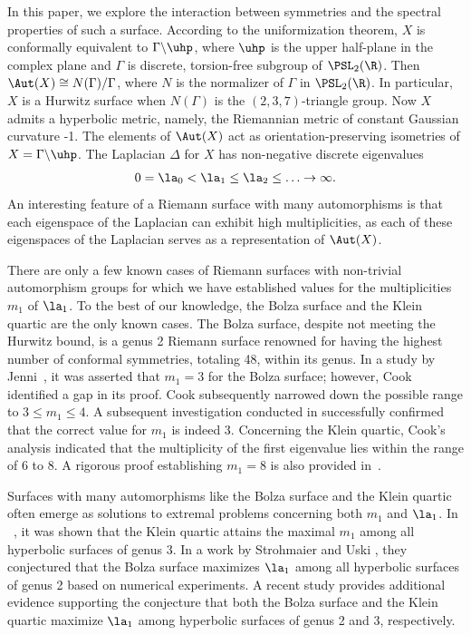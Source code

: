In this paper, we explore the interaction between symmetries and the spectral properties of such a surface.
According to the uniformization theorem, $X$ is conformally equivalent to $\Gamma\backslash \uhp$, where
$\uhp$ is the upper half-plane in the complex plane and $\Gamma$ is discrete, torsion-free subgroup of $\PSL_2(\R)$.
Then $\Aut(X) \cong N(\Gamma) / \Gamma$, where $N$ is the normalizer of $\Gamma$ in $\PSL_{2}(\R)$. 
In particular, $X$ is a Hurwitz surface when $N(\Gamma)$ is the $(2,3,7)$-triangle group.
Now $X$ admits a hyperbolic metric, namely, the Riemannian metric of constant Gaussian curvature -1.
The elements of $\Aut(X)$ act as orientation-preserving isometries of $X=\Gamma\backslash \uhp$.
The Laplacian $\Delta$ for $X$ has non-negative discrete eigenvalues
\[
0=\la_0< \la_1 \leq \la_2 \leq \ldots \to \infty.
\]
An interesting feature of a Riemann surface with many automorphisms is that each eigenspace of the Laplacian can exhibit high multiplicities, as each of these eigenspaces of the Laplacian serves as a representation of $\Aut(X)$.

There are only a few known cases of Riemann surfaces with non-trivial automorphism groups for which we have established values for the multiplicities $m_1$ of $\la_1$.
To the best of our knowledge, the Bolza surface and the Klein quartic are the only known cases.
The Bolza surface, despite not meeting the Hurwitz bound, is a genus 2 Riemann surface renowned for having the highest number of conformal symmetries, totaling 48, within its genus.
In a study by Jenni~\cite{jenni1984}, it was asserted that $m_1=3$ for the Bolza surface; however, Cook~\cite{cook2018} identified a gap in its proof.
Cook subsequently narrowed down the possible range to $3 \leq m_1 \leq 4$.
A subsequent investigation conducted in \cite{FBP21} successfully confirmed that the correct value for $m_1$ is indeed 3.
Concerning the Klein quartic, Cook's analysis indicated that the multiplicity of the first eigenvalue lies within the range of 6 to 8.
A rigorous proof establishing $m_1=8$ is also provided in~\cite{FBP21}.

Surfaces with many automorphisms like the Bolza surface and the Klein quartic often emerge as solutions to extremal problems concerning both $m_1$ and $\la_1$.
In ~\cite{FBP21}, it was shown that the Klein quartic attains the maximal $m_1$ among all hyperbolic surfaces of genus 3.
In a work by Strohmaier and Uski \cite{MR3009726}, they conjectured that the Bolza surface maximizes $\la_1$ among all hyperbolic surfaces of genus 2 based on numerical experiments.
A recent study \cite{kravchuk2023automorphic} provides additional evidence supporting the conjecture that both the Bolza surface and the Klein quartic maximize $\la_1$ among hyperbolic surfaces of genus 2 and 3, respectively.

